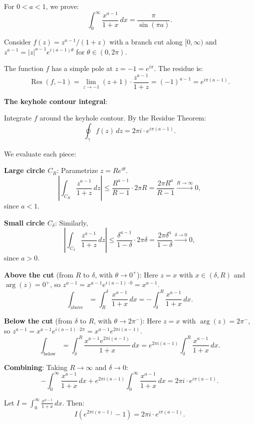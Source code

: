 \begin{example}
  For $0 < a < 1$, we prove:
  \[
    \int_0^{\infty} \frac{x^{a-1}}{1 + x} \, dx = \frac{\pi}{\sin(\pi a)}.
  \]

  Consider $f(z) = z^{a-1}/(1+z)$ with a branch cut along $[0, \infty)$ and $z^{a-1} = |z|^{a-1} e^{i(a-1)\theta}$ for $\theta \in (0, 2\pi)$.

  The function $f$ has a simple pole at $z = -1 = e^{i\pi}$. The residue is:
  \[
    \operatorname{Res}(f, -1) = \lim_{z \to -1} (z + 1) \cdot \frac{z^{a-1}}{1+z} = (-1)^{a-1} = e^{i\pi(a-1)}.
  \]

  \textbf{The keyhole contour integral}:

  Integrate $f$ around the keyhole contour. By the Residue Theorem:
  \[
    \oint_{\gamma} f(z) \, dz = 2\pi i \cdot e^{i\pi(a-1)}.
  \]

  We evaluate each piece:

  \textbf{Large circle $C_R$}: Parametrize $z = Re^{i\theta}$.
  \[
    \left| \int_{C_R} \frac{z^{a-1}}{1+z} \, dz \right| \leq \frac{R^{a-1}}{R - 1} \cdot 2\pi R = \frac{2\pi R^a}{R - 1} \xrightarrow{R \to \infty} 0,
  \]
  since $a < 1$.

  \textbf{Small circle $C_\delta$}: Similarly,
  \[
    \left| \int_{C_\delta} \frac{z^{a-1}}{1+z} \, dz \right| \leq \frac{\delta^{a-1}}{1 - \delta} \cdot 2\pi \delta = \frac{2\pi \delta^a}{1 - \delta} \xrightarrow{\delta \to 0} 0,
  \]
  since $a > 0$.

  \textbf{Above the cut} (from $R$ to $\delta$, with $\theta \to 0^+$):
  Here $z = x$ with $x \in (\delta, R)$ and $\arg(z) = 0^+$, so $z^{a-1} = x^{a-1} e^{i(a-1) \cdot 0} = x^{a-1}$.
  \[
    \int_{\text{above}} = \int_R^\delta \frac{x^{a-1}}{1+x} \, dx = -\int_\delta^R \frac{x^{a-1}}{1+x} \, dx.
  \]

  \textbf{Below the cut} (from $\delta$ to $R$, with $\theta \to 2\pi^-$):
  Here $z = x$ with $\arg(z) = 2\pi^-$, so $z^{a-1} = x^{a-1} e^{i(a-1) \cdot 2\pi} = x^{a-1} e^{2\pi i(a-1)}$.
  \[
    \int_{\text{below}} = \int_\delta^R \frac{x^{a-1} e^{2\pi i(a-1)}}{1+x} \, dx = e^{2\pi i(a-1)} \int_\delta^R \frac{x^{a-1}}{1+x} \, dx.
  \]

  \textbf{Combining}: Taking $R \to \infty$ and $\delta \to 0$:
  \[
    -\int_0^\infty \frac{x^{a-1}}{1+x} \, dx + e^{2\pi i(a-1)} \int_0^\infty \frac{x^{a-1}}{1+x} \, dx = 2\pi i \cdot e^{i\pi(a-1)}.
  \]

  Let $I = \int_0^\infty \frac{x^{a-1}}{1+x} \, dx$. Then:
  \[
    I \left( e^{2\pi i(a-1)} - 1 \right) = 2\pi i \cdot e^{i\pi(a-1)}.
  \]


\end{example}
